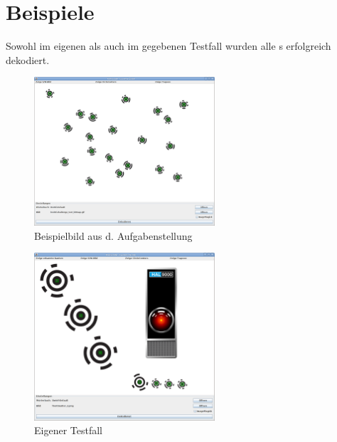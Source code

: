 \pagebreak
\section{Beispiele}
Sowohl im eigenen als auch im gegebenen Testfall wurden alle \task{}s erfolgreich dekodiert.
\begin{figure}[!ht]
	\centering	
	\includegraphics[width=0.6\textwidth]{Grafiken/sek2bsp1}
	\caption{Beispielbild aus d. Aufgabenstellung}
\end{figure}
\vfill{}
\begin{figure}[!ht]
	\centering	
	\includegraphics[width=0.6\textwidth]{Grafiken/sek2bsp2}
	\caption{Eigener Testfall}
\end{figure}
